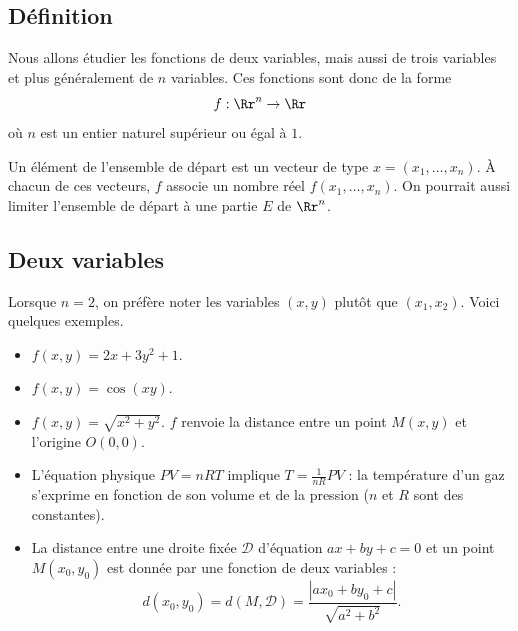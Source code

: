 \documentclass[11pt,class=report,crop=false]{standalone}
\begin{document}
\subsection{Définition}


Nous allons étudier les fonctions de deux variables, mais aussi de trois variables et plus généralement de $n$ variables.
Ces fonctions sont donc de la forme 
$$f : \Rr^n \rightarrow \Rr$$
où $n$ est un entier naturel supérieur ou égal à $1$. 


Un élément de l'ensemble de départ est un vecteur de type  $x = (x_1,\ldots,x_n)$. À chacun de ces vecteurs, $f$ associe un nombre réel $f(x_1,\ldots,x_n)$. On pourrait aussi limiter l'ensemble de départ à une partie $E$ de $ \Rr^n$.



\subsection{Deux variables}

Lorsque $n=2$, on préfère noter les variables $(x,y)$ plutôt que $(x_1,x_2)$.
Voici quelques exemples.
\begin{exemple}
\sauteligne
\begin{itemize}
  \item $f(x,y) = 2x+3y^2+1$.
  \item $f(x,y) = \cos(xy)$.
  \item $f(x,y) = \sqrt{x^2+y^2}$. $f$ renvoie la distance entre un point $M(x,y)$ et l'origine $O(0,0)$.
  
  
  \item L'équation physique $PV=nRT$ implique $T = \frac{1}{nR}PV$ :
  la température d'un gaz s'exprime en fonction de son volume et de la pression ($n$ et $R$ sont des constantes).
  \item La distance entre une droite fixée $\mathcal{D}$ d'équation $ax+by+c=0$ et un point $M(x_0,y_0)$ est donnée par une fonction de deux variables : $$d(x_0,y_0) = d(M,\mathcal{D}) = \frac{|ax_0+by_0+c|}{\sqrt{a^2+b^2}}.$$

  
  
\end{itemize}
\end{exemple}
\end{document}
